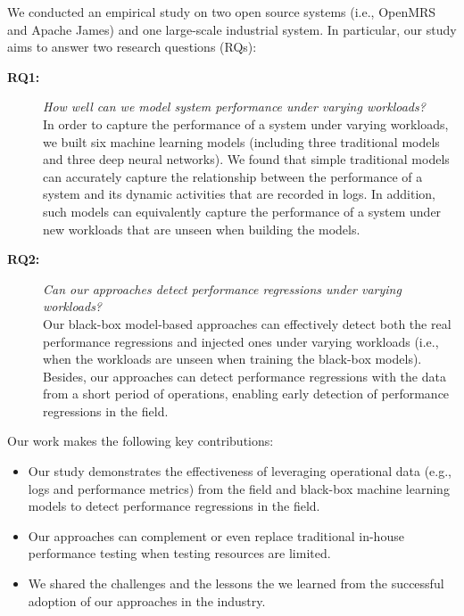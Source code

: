 We conducted an empirical study on two open source systems (i.e., OpenMRS and Apache James) and one large-scale industrial system. %
In particular, our study aims to answer two research questions (RQs):
\begin{description}
\item[\textbf{RQ1:}] \textit{How well can we model system performance under varying workloads?} \\ %
In order to capture the performance of a system under varying workloads, we built six machine learning models (including three traditional models and three deep neural networks).
We found that simple traditional models can accurately capture the relationship between the performance of a system and its dynamic activities that are recorded in logs. %
In addition, such models can equivalently capture the performance of a system under new workloads that are unseen when building the models.

\item[\textbf{RQ2:}] \textit{Can our approaches detect performance regressions under varying workloads?} \\ %
Our black-box model-based approaches can effectively detect both the real performance regressions and injected ones under varying workloads (i.e., when the workloads are unseen when training the black-box models).
Besides, our approaches can detect performance regressions with the data from a short period of operations, enabling early detection of performance regressions in the field.

\end{description}

Our work makes the following key contributions:
\begin{itemize} 
    \item Our study demonstrates the effectiveness of leveraging operational data (e.g., logs and performance metrics) from the field and black-box machine learning models to detect performance regressions in the field.
    \item Our approaches can complement or even replace traditional in-house performance testing when testing resources are limited.
    \item We shared the challenges and the lessons the we learned from the successful adoption of our approaches in the industry.
\end{itemize}

